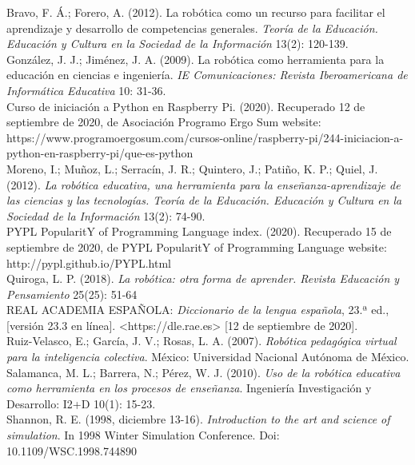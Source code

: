 \documentclass{report}
\begin{document}
Bravo, F. Á.; Forero, A. (2012). La robótica como un recurso para facilitar el aprendizaje y desarrollo de competencias generales. \textit{Teoría de la Educación. Educación y Cultura en la Sociedad de la Información} 13(2): 120-139.
\\

González, J. J.; Jiménez, J. A. (2009). La robótica como herramienta para la educación en ciencias e ingeniería. \textit{IE Comunicaciones: Revista Iberoamericana de Informática Educativa} 10: 31-36.
\\

Curso de iniciación a Python en Raspberry Pi. (2020). Recuperado 12 de septiembre de 2020, de Asociación Programo Ergo Sum website: https://www.programoergosum.com/cursos-online/raspberry-pi/244-iniciacion-a-python-en-raspberry-pi/que-es-python
\\

Moreno, I.; Muñoz, L.; Serracín, J. R.; Quintero, J.; Patiño, K. P.; Quiel, J. (2012).\textit{ La robótica educativa, una herramienta para la enseñanza-aprendizaje de las ciencias y las tecnologías. Teoría de la Educación. Educación y Cultura en la Sociedad de la Información} 13(2): 74-90.
\\

PYPL PopularitY of Programming Language index. (2020). Recuperado 15 de septiembre de 2020, de PYPL PopularitY of Programming Language website: http://pypl.github.io/PYPL.html
\\

Quiroga, L. P. (2018). \textit{La robótica: otra forma de aprender. Revista Educación y Pensamiento} 25(25): 51-64
\\

REAL ACADEMIA ESPAÑOLA: \textit{Diccionario de la lengua española}, 23.ª ed., [versión 23.3 en línea]. <https://dle.rae.es> [12 de septiembre de 2020].
\\

Ruiz-Velasco, E.; García, J. V.; Rosas, L. A. (2007). \textit{Robótica pedagógica virtual para la inteligencia colectiva}. México: Universidad Nacional Autónoma de México.
\\

Salamanca, M. L.; Barrera, N.; Pérez, W. J. (2010). \textit{Uso de la robótica educativa como herramienta en los procesos de enseñanza}. Ingeniería Investigación y Desarrollo: I2+D 10(1): 15-23.
\\

Shannon, R. E. (1998, diciembre 13-16). \textit{Introduction to the art and science of simulation}. In 1998 Winter Simulation Conference. Doi: 10.1109/WSC.1998.744890
\end{document}
